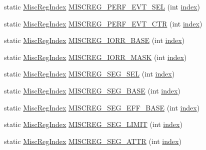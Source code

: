 \begin{DoxyCompactItemize}
\item 
static \hyperlink{namespaceX86ISA_a1e522017e015d4c7efd6b2360143aa67}{MiscRegIndex} \hyperlink{namespaceX86ISA_a7808596c37e2fec948e85a3c612cd3b7}{MISCREG\_\-PERF\_\-EVT\_\-SEL} (int \hyperlink{namespaceX86ISA_aa7f971ede8ba06dbd8a605007eda1c6f}{index})
\item 
static \hyperlink{namespaceX86ISA_a1e522017e015d4c7efd6b2360143aa67}{MiscRegIndex} \hyperlink{namespaceX86ISA_adf79cb6816cce0adf35b8b7808facc44}{MISCREG\_\-PERF\_\-EVT\_\-CTR} (int \hyperlink{namespaceX86ISA_aa7f971ede8ba06dbd8a605007eda1c6f}{index})
\item 
static \hyperlink{namespaceX86ISA_a1e522017e015d4c7efd6b2360143aa67}{MiscRegIndex} \hyperlink{namespaceX86ISA_ae947cc3d36a3597e5396c8b7824d2b2b}{MISCREG\_\-IORR\_\-BASE} (int \hyperlink{namespaceX86ISA_aa7f971ede8ba06dbd8a605007eda1c6f}{index})
\item 
static \hyperlink{namespaceX86ISA_a1e522017e015d4c7efd6b2360143aa67}{MiscRegIndex} \hyperlink{namespaceX86ISA_af40958c001ad1b78bdd1174e2964d26a}{MISCREG\_\-IORR\_\-MASK} (int \hyperlink{namespaceX86ISA_aa7f971ede8ba06dbd8a605007eda1c6f}{index})
\item 
static \hyperlink{namespaceX86ISA_a1e522017e015d4c7efd6b2360143aa67}{MiscRegIndex} \hyperlink{namespaceX86ISA_a7a287359d6688cb50477df97dcbdd196}{MISCREG\_\-SEG\_\-SEL} (int \hyperlink{namespaceX86ISA_aa7f971ede8ba06dbd8a605007eda1c6f}{index})
\item 
static \hyperlink{namespaceX86ISA_a1e522017e015d4c7efd6b2360143aa67}{MiscRegIndex} \hyperlink{namespaceX86ISA_a310d36d3d8ec55a84d807cb7e1edf7d6}{MISCREG\_\-SEG\_\-BASE} (int \hyperlink{namespaceX86ISA_aa7f971ede8ba06dbd8a605007eda1c6f}{index})
\item 
static \hyperlink{namespaceX86ISA_a1e522017e015d4c7efd6b2360143aa67}{MiscRegIndex} \hyperlink{namespaceX86ISA_a48969e78833727c474e77163559d3cc0}{MISCREG\_\-SEG\_\-EFF\_\-BASE} (int \hyperlink{namespaceX86ISA_aa7f971ede8ba06dbd8a605007eda1c6f}{index})
\item 
static \hyperlink{namespaceX86ISA_a1e522017e015d4c7efd6b2360143aa67}{MiscRegIndex} \hyperlink{namespaceX86ISA_af93c7fd7ac0d329975952ac0c2a97f98}{MISCREG\_\-SEG\_\-LIMIT} (int \hyperlink{namespaceX86ISA_aa7f971ede8ba06dbd8a605007eda1c6f}{index})
\item 
static \hyperlink{namespaceX86ISA_a1e522017e015d4c7efd6b2360143aa67}{MiscRegIndex} \hyperlink{namespaceX86ISA_abb8ec3742a54286da349c98a1a9c9755}{MISCREG\_\-SEG\_\-ATTR} (int \hyperlink{namespaceX86ISA_aa7f971ede8ba06dbd8a605007eda1c6f}{index})

\end{DoxyCompactItemize}
